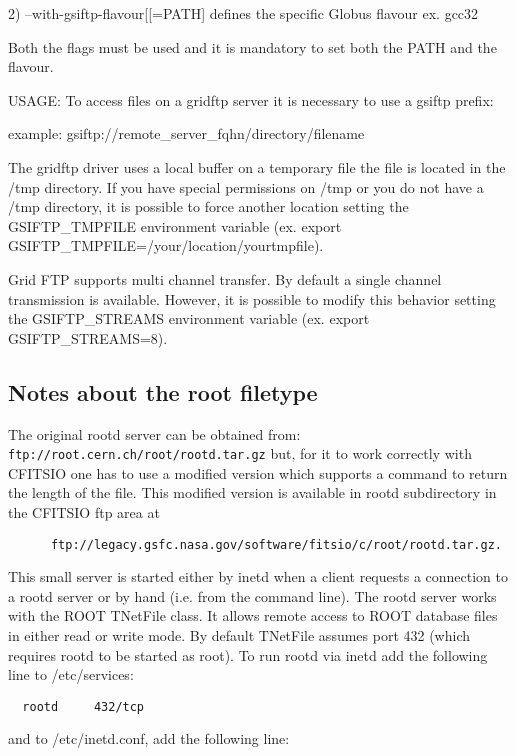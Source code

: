 \documentclass[11pt]{book}
\begin{document}
2)  --with-gsiftp-flavour[[=PATH] defines the specific Globus flavour
        ex. gcc32

Both the flags must be used and it is mandatory to set  both the PATH and the
flavour.

USAGE: To access files on a gridftp server it is necessary to use a gsiftp prefix:

example: gsiftp://remote\_server\_fqhn/directory/filename

The gridftp driver uses a local buffer on a temporary file the file is located
in the /tmp directory. If you have special permissions on /tmp or you do not have a /tmp
directory, it is possible to force another location setting the GSIFTP\_TMPFILE environment
variable (ex. export GSIFTP\_TMPFILE=/your/location/yourtmpfile).

Grid FTP supports multi channel transfer. By default a single channel transmission is
available. However, it is possible to modify this behavior setting the GSIFTP\_STREAMS
environment variable (ex. export GSIFTP\_STREAMS=8).



\subsection{Notes about the root filetype}

The original rootd server can be obtained from:
\verb-ftp://root.cern.ch/root/rootd.tar.gz-
but, for it to work correctly with CFITSIO one has to use a modified
version which supports a command to return the length of the file.
This modified version is available in rootd subdirectory
in the CFITSIO ftp area at

\begin{verbatim}
      ftp://legacy.gsfc.nasa.gov/software/fitsio/c/root/rootd.tar.gz.
\end{verbatim}

This small server is started either by inetd when a client requests a
connection to a rootd server or by hand (i.e. from the command line).
The rootd server works with the ROOT TNetFile class. It allows remote
access to ROOT database files in either read or write mode. By default
TNetFile assumes port 432 (which requires rootd to be started as root).
To run rootd via inetd add the following line to /etc/services:

\begin{verbatim}
  rootd     432/tcp
\end{verbatim}
and to /etc/inetd.conf, add the following line:
\end{document}
